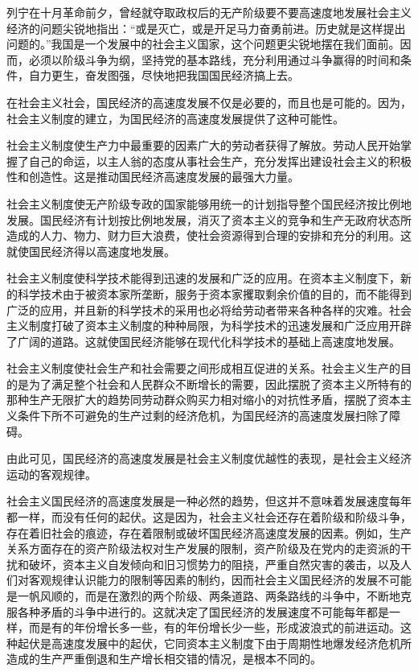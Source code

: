 \documentclass{book}
\begin{document}
列宁在十月革命前夕，曾经就夺取政权后的无产阶级要不要高速度地发展社会主义经济的问题尖锐地指出：“或是灭亡，或是开足马力奋勇前进。历史就是这样提出问题的。”我国是一个发展中的社会主义国家，这个问题更尖锐地摆在我们面前。因而，必须以阶级斗争为纲，坚持党的基本路线，充分利用通过斗争赢得的时间和条件，自力更生，奋发图强，尽快地把我国国民经济搞上去。

在社会主义社会，国民经济的高速度发展不仅是必要的，而且也是可能的。因为，社会主义制度的建立，为国民经济的高速度发展提供了这种可能性。

社会主义制度使生产力中最重要的因素广大的劳动者获得了解放。劳动人民开始掌握了自己的命运，以主人翁的态度从事社会生产，充分发挥出建设社会主义的积极性和创造性。这是推动国民经济高速度发展的最强大力量。

社会主义制度使无产阶级专政的国家能够用统一的计划指导整个国民经济按比例地发展。国民经济有计划按比例地发展，消灭了资本主义的竞争和生产无政府状态所造成的人力、物力、财力巨大浪费，使社会资源得到合理的安排和充分的利用。这就使国民经济得以高速度地发展。

社会主义制度使科学技术能得到迅速的发展和广泛的应用。在资本主义制度下，新的科学技术由于被资本家所垄断，服务于资本家攫取剩余价值的目的，而不能得到广泛的应用，并且新的科学技术的采用也必将给劳动者带来各种各样的灾难。社会主义制度打破了资本主义制度的种种局限，为科学技术的迅速发展和广泛应用开辟了广阔的道路。这就使国民经济能够在现代化科学技术的基础上高速度地发展。

社会主义制度使社会生产和社会需要之间形成相互促进的关系。社会主义生产的目的是为了满足整个社会和人民群众不断增长的需要，因此摆脱了资本主义所特有的那种生产无限扩大的趋势同劳动群众购买力相对缩小的对抗性矛盾，摆脱了资本主义条件下所不可避免的生产过剩的经济危机，为国民经济的高速度发展扫除了障碍。

由此可见，国民经济的高速度发展是社会主义制度优越性的表现，是社会主义经济运动的客观规律。

社会主义国民经济的高速度发展是一种必然的趋势，但这并不意味着发展速度每年都一样，而没有任何的起伏。这是因为，社会主义社会还存在着阶级和阶级斗争，存在着旧社会的痕迹，存在着限制或破坏国民经济高速度发展的因素。例如，生产关系方面存在的资产阶级法权对生产发展的限制，资产阶级及在党内的走资派的干扰和破坏，资本主义自发倾向和旧习惯势力的阻挠，严重自然灾害的袭击，以及人们对客观规律认识能力的限制等因素的制约，因而社会主义国民经济的发展不可能是一帆风顺的，而是在激烈的两个阶级、两条道路、两条路线的斗争中，不断地克服各种矛盾的斗争中进行的。这就决定了国民经济的发展速度不可能每年都是一样，而是有的年份增长多一些，有的年份增长少一些，形成波浪式的前进运动。这种起伏是高速度发展中的起伏，它同资本主义制度下由于周期性地爆发经济危机所造成的生产严重倒退和生产增长相交错的情况，是根本不同的。
\end{document}
